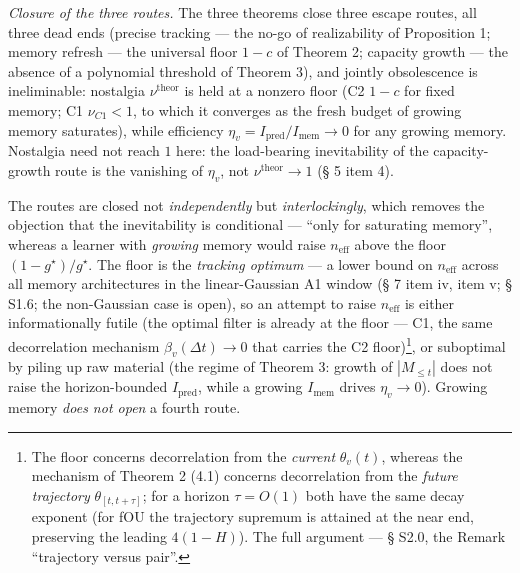 \documentclass[12pt]{iopart}
\begin{document}
\emph{Closure of the three routes.} The three theorems close three escape routes, all three dead ends (precise tracking --- the no-go of realizability of Proposition 1; memory refresh --- the universal floor \(1-c\) of Theorem 2; capacity growth --- the absence of a polynomial threshold of Theorem 3), and jointly obsolescence is ineliminable: nostalgia \(\nu^{\text{theor}}\) is held at a nonzero floor (C2 \(1-c\) for fixed memory; C1 \(\nu_{C1} < 1\), to which it converges as the fresh budget of growing memory saturates), while efficiency \(\eta_v = I_{\text{pred}}/I_{\text{mem}} \to 0\) for any growing memory. Nostalgia need not reach \(1\) here: the load-bearing inevitability of the capacity-growth route is the vanishing of \(\eta_v\), not \(\nu^{\text{theor}} \to 1\) (§ 5 item 4).



The routes are closed not \emph{independently} but \emph{interlockingly}, which removes the objection that the inevitability is conditional --- ``only for saturating memory'', whereas a learner with \emph{growing} memory would raise \(n_{\text{eff}}\) above the floor \((1-g^\star)/g^\star\). The floor is the \emph{tracking optimum} --- a lower bound on \(n_{\text{eff}}\) across all memory architectures in the linear-Gaussian A1 window (§ 7 item iv, item v; § S1.6; the non-Gaussian case is open), so an attempt to raise \(n_{\text{eff}}\) is either informationally futile (the optimal filter is already at the floor --- C1, the same decorrelation mechanism \(\beta_v(\Delta t)\to0\) that carries the C2 floor)\footnote{The floor concerns decorrelation from the \emph{current} \(\theta_v(t)\), whereas the mechanism of Theorem 2 (4.1) concerns decorrelation from the \emph{future trajectory} \(\theta_{[t,t+\tau]}\); for a horizon \(\tau = O(1)\) both have the same decay exponent (for fOU the trajectory supremum is attained at the near end, preserving the leading \(4(1-H)\)). The full argument --- § S2.0, the Remark ``trajectory versus pair''.}, or suboptimal by piling up raw material (the regime of Theorem 3: growth of \(|M_{\le t}|\) does not raise the horizon-bounded \(I_{\text{pred}}\), while a growing \(I_{\text{mem}}\) drives \(\eta_v \to 0\)). Growing memory \emph{does not open} a fourth route.
\end{document}
